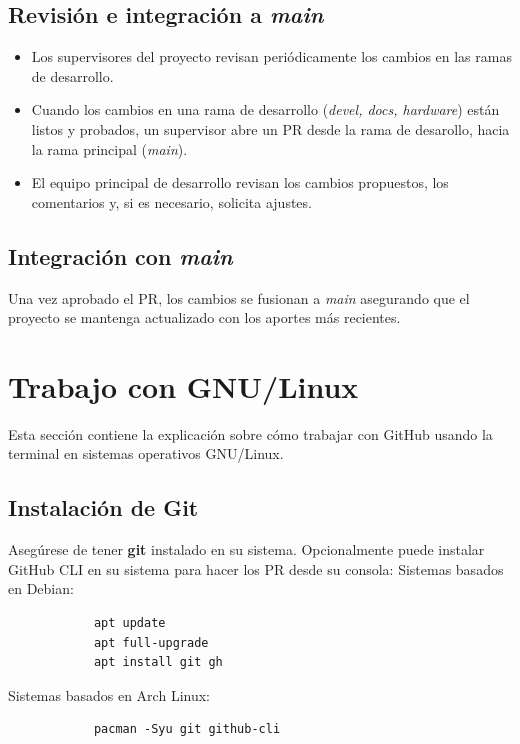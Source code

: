 \documentclass[a4paper]{article}
\begin{document}
        \subsection{Revisión e integración a \textit{main}}
        \begin{itemize}
            \item Los supervisores del proyecto revisan periódicamente los cambios en las ramas de desarrollo.
            \item Cuando los cambios en una rama de desarrollo (\textit{devel, docs, hardware}) están listos y probados, un supervisor abre un PR desde la rama de desarollo, hacia la rama principal (\textit{main}).
            \item El equipo principal de desarrollo revisan los cambios propuestos, los comentarios y, si es necesario, solicita ajustes.
        \end{itemize}

    \subsection{Integración con \textit{main}}
        Una vez aprobado el PR, los cambios se fusionan a \textit{main} asegurando que el proyecto se mantenga actualizado con los aportes más recientes.
        
\section{Trabajo con GNU/Linux}
\indent Esta sección contiene la explicación sobre cómo trabajar con GitHub usando la terminal en sistemas operativos GNU/Linux.
\subsection{Instalación de Git}
    Asegúrese de tener \textbf{git} instalado en su sistema. Opcionalmente puede instalar GitHub CLI en su sistema para hacer los PR desde su consola:
    \newline
    Sistemas basados en Debian:
    \begin{center}
        \begin{lstlisting}
            apt update 
            apt full-upgrade 
            apt install git gh 
        \end{lstlisting}
    \end{center}
    Sistemas basados en Arch Linux:
    \begin{center}
        \begin{lstlisting}
            pacman -Syu git github-cli
        \end{lstlisting}
    \end{center}
\end{document}
